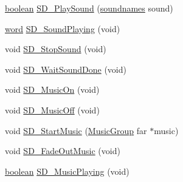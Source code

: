 \begin{DoxyCompactItemize}
\item 
\hyperlink{ID__HEAD_8H_a7c6368b321bd9acd0149b030bb8275ed}{boolean} \hyperlink{ID__SD_8C_af6a678e2015e6474a341bbd8ab03c12f}{SD\_\-PlaySound} (\hyperlink{AUDIOSDM_8H_a4a3d02bfe7b02201dbba1993b77ae7e1}{soundnames} sound)
\item 
\hyperlink{ID__HEAD_8H_abad51e07ab6d26bec9f1f786c8d65bcd}{word} \hyperlink{ID__SD_8C_a32826e61458fce0f5667e3e1f4db95f4}{SD\_\-SoundPlaying} (void)
\item 
void \hyperlink{ID__SD_8C_ac98e41e0645d624d0645219c8eca9615}{SD\_\-StopSound} (void)
\item 
void \hyperlink{ID__SD_8C_a92c51dce596da266c75185c1c5b37095}{SD\_\-WaitSoundDone} (void)
\item 
void \hyperlink{ID__SD_8C_a3de23daedac0200fbc38736dd8c755e3}{SD\_\-MusicOn} (void)
\item 
void \hyperlink{ID__SD_8C_ae8e46be37d6285a8cc13d7a68c9f1a0e}{SD\_\-MusicOff} (void)
\item 
void \hyperlink{ID__SD_8C_a1b66a386f3785697d07238f3610e3b89}{SD\_\-StartMusic} (\hyperlink{structMusicGroup}{MusicGroup} far $\ast$music)
\item 
void \hyperlink{ID__SD_8C_afa09f503f31c9e9c4d77cf6dc8a0932f}{SD\_\-FadeOutMusic} (void)
\item 
\hyperlink{ID__HEAD_8H_a7c6368b321bd9acd0149b030bb8275ed}{boolean} \hyperlink{ID__SD_8C_aa097386a2a5ed395cef780871ba74a85}{SD\_\-MusicPlaying} (void)
\end{DoxyCompactItemize}
